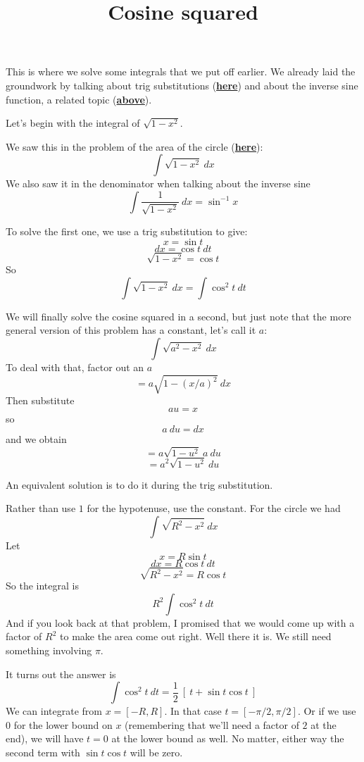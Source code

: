 \documentclass[11pt, oneside]{article}
\title{Cosine squared}
\date{}
\begin{document}
\maketitle
\Large


\label{sec:Cosine_squared}

This is where we solve some integrals that we put off earlier.  We already laid the groundwork by talking about trig substitutions (\hyperref[sec:Techniques_of_integration]{\textbf{here}}) and about the inverse sine function, a related topic (\hyperref[sec:Inverse_trig]{\textbf{above}}).

Let's begin with the integral of $\sqrt{1 - x^2}$.  

We saw this in the problem of the area of the circle (\hyperref[sec:Easy_pieces]{\textbf{here}}):
\[ \int \sqrt{1 - x^2} \ dx \]
We also saw it in the denominator when talking about the inverse sine
\[ \int \frac{1}{\sqrt{1 - x^2}} \ dx = \sin^{-1} x \]

To solve the first one, we use a trig substitution to give:
\[ x = \sin t \]
\[ dx = \cos t \ dt \]
\[ \sqrt{1-x^2} = \cos t \]
So
\[ \int \sqrt{1 - x^2} \ dx = \int \cos^2 t \ dt \]

We will finally solve the cosine squared in a second, but just note that the more general version of this problem has a constant, let's call it $a$:
\[ \int \sqrt{a^2 - x^2} \ dx \]
To deal with that, factor out an $a$
\[ = a \sqrt{1 - (x/a)^2} \ dx \]
Then substitute 
\[ au = x \]
 so 
 \[ a \ du = dx \]
 and we obtain
\[ = a \sqrt{1 - u^2} \ a \ du \]
\[ = a^2 \sqrt{1 - u^2}  \ du  \]

An equivalent solution is to do it during the trig substitution.

Rather than use $1$ for the hypotenuse, use the constant.  For the circle we had
\[ \int \sqrt{R^2 - x^2} \ dx \]
Let 
\[ x = R \sin t \]
\[ dx = R \cos t \ dt \]
\[ \sqrt{R^2 - x^2} = R \cos t \]
So the integral is
\[ R^2 \int \cos^2 t \ dt \]
And if you look back at that problem, I promised that we would come up with a factor of $R^2$ to make the area come out right.  Well there it is.  We still need something involving $\pi$.

It turns out the answer is 
\[ \int \cos^2 t \ dt = \frac{1}{2} \ [ \ t + \sin t \cos t \ ]  \]
We can integrate from $x = [-R,R]$.  In that case $t = [-\pi/2, \pi/2]$.  Or if we  use $0$ for the lower bound on $x$ (remembering that we'll need a factor of $2$ at the end), we will have $t = 0$ at the lower bound as well.  No matter, either way the second term with $\sin t \cos t$ will be zero.  
\end{document}
